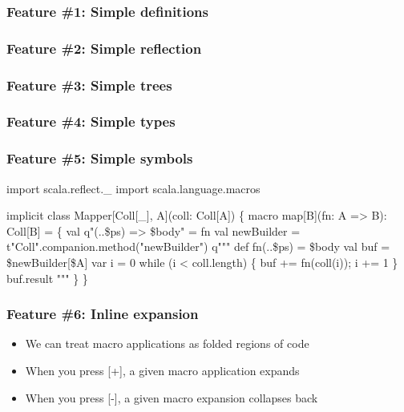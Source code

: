 \documentclass[svgnames,dvipsnames,hyperref={bookmarks=false}]{beamer}
\begin{document}
\begin{frame}[fragile]
\frametitle<1>{Feature \#1: Simple definitions}
\frametitle<2>{Feature \#2: Simple reflection}
\frametitle<3>{Feature \#3: Simple trees}
\frametitle<4>{Feature \#4: Simple types}
\frametitle<5>{Feature \#5: Simple symbols}

\begin{semiverbatim}\small{
\alert<2>{import scala.reflect._}
import scala.language.macros

implicit class Mapper[Coll[_], A](coll: Coll[A]) \{
  \alert<1>{macro map[B](fn: A => B): Coll[B]} = \{
    val \alert<3>{q"(..\$ps) => \$body"} = fn
    val newBuilder = \alert<5>{\alert<2>{\alert<4>{t"Coll"}.companion.method("newBuilder")}}
    \alert<3>{q"""
      \alert<5>{def fn(..\$ps) = \$body}
      val buf = \$newBuilder[\alert<4>{\$A}]
      var i = 0
      while (i < coll.length) \{ buf += fn(coll(i)); i += 1 \}
      buf.result
    """}
  \}
\}}
\end{semiverbatim}

\begin{itemize}
\end{itemize}
\end{frame}

\begin{frame}[fragile]
\frametitle{Feature \#6: Inline expansion}
\begin{itemize}
\item We can treat macro applications as folded regions of code
\item When you press [+], a given macro application expands
\item When you press [-], a given macro expansion collapses back
\end{itemize}
\end{frame}
\end{document}
